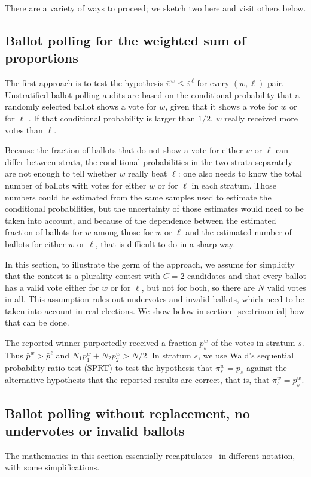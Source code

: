 \documentclass[12pt]{article}
\newcommand{\bpi}{\bar{\pi}}
\newcommand{\bp}{\bar{p}}
\begin{document}
There are a variety of ways to proceed; we sketch two here and visit others below.


\subsection{Ballot polling for the weighted sum of proportions}
The first approach is to test the hypothesis 
$\bpi^w \le \bpi^\ell$ for every $(w, \ell)$ pair.
Unstratified ballot-polling audits are based on the conditional 
probability that a randomly selected
ballot shows a vote for $w$, given that it shows a vote for $w$ or for $\ell$
\citep{lindemanStark12,lindemanEtal12}.
If that conditional probability is larger than $1/2$, $w$ really received more votes than
$\ell$.

Because the fraction of ballots that do not show a vote for either $w$ or $\ell$ can differ
between strata, the conditional probabilities in the two strata separately are not enough
to tell whether $w$ really beat $\ell$: one also needs to know the total number of ballots with votes 
for either $w$ or for $\ell$ in each stratum.
Those numbers could be estimated from the same samples used to estimate the conditional 
probabilities, but the uncertainty of those estimates would need to be taken into account, and 
because of the dependence between the estimated fraction of ballots for $w$ among those for $w$ or $\ell$
and the estimated number of ballots for either $w$ or $\ell$, that is difficult to do in a sharp way.

In this section, to illustrate the germ of the approach,
we assume for simplicity that the contest is a plurality contest with $C=2$ candidates and
that every ballot
has a valid vote either for $w$ or for $\ell$, but not for both, so there are $N$ valid votes in all.
This assumption rules out undervotes and invalid ballots, which need to be taken into
account in real elections. 
We show below in section~\ref{sec:trinomial} how that can be done.

The reported winner purportedly received a fraction $p_s^w$ of the votes in stratum $s$.
Thus $\bp^w > \bp^\ell$ and $N_1 p_1^w + N_2p_2^w > N/2$.
In stratum $s$, we use Wald's sequential probability ratio test (SPRT) to
test the hypothesis that $\pi_s^w = p_s$ against the alternative hypothesis 
that the reported results are correct, that is, that $\pi_s^w = p_s^w$.


\subsection{Ballot polling without replacement, no undervotes or invalid ballots}
The mathematics in this section essentially 
recapitulates~\citet[pp43--44]{wald45} in different notation, with some simplifications.
\end{document}

